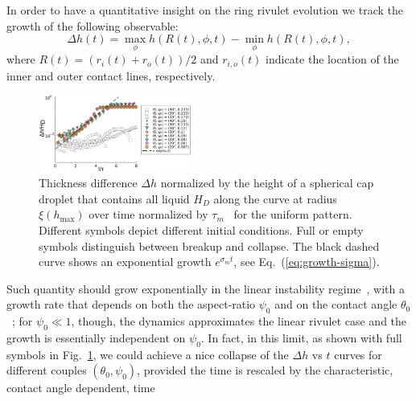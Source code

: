 \documentclass[twoside,twocolumn,9pt]{article}
\begin{document}
In order to have a quantitative insight on the ring rivulet evolution we track the growth of the following 
observable:
\begin{equation}\label{eq:delta-h-measure}
       \Delta h(t) = \max_{\phi}h(R(t),\phi,t) - \min_{\phi}h(R(t),\phi,t),
\end{equation}
where $R(t) = (r_i(t)+r_o(t))/2$ and $r_{i,o}(t)$ indicate the location of the inner and outer contact lines, 
respectively. 

\begin{figure}
    \centering
    \includegraphics[width=0.45\textwidth]{assets/growth-breakup.pdf}
    \caption{Thickness difference $\Delta h$ normalized by the height of a spherical cap droplet that contains all liquid $H_D$ along the curve at radius $\xi(h_{\max})$ over time normalized by $\tau_{m}$~\cite{wuBreakupPatternedNanoscale2010} for the uniform pattern. 
    Different symbols depict different initial conditions. 
    Full or empty symbols distinguish between breakup and collapse. 
    The black dashed curve shows an exponential growth $e^{\sigma_m t}$, see Eq.~(\ref{eq:growth-sigma}).
    }
    \label{fig:first_growth}
\end{figure}
Such quantity should grow exponentially in the linear instability regime~\cite{wuBreakupPatternedNanoscale2010, gonzalezStabilityLiquidRing2013, nguyenCompetitionCollapseBreakup2012}, with a growth rate that depends on 
both the aspect-ratio $\psi_0$ and on the contact angle $\theta_0$~\cite{gonzalezStabilityLiquidRing2013}; for $\psi_0 \ll 1$, though, the dynamics approximates the 
linear rivulet case and the growth is essentially independent on $\psi_0$. In fact, in this limit, 
as shown with full symbols in Fig.~\ref{fig:first_growth}, we could achieve a nice collapse of the $\Delta h$ vs $t$ 
curves for different couples $(\theta_0,\psi_0)$, provided the time is rescaled by the characteristic, contact angle dependent, time 
\end{document}
